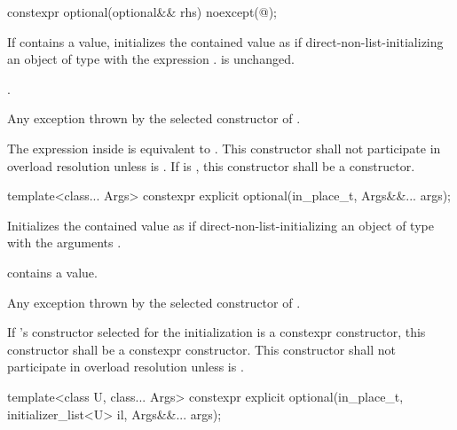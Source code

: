 %
\begin{itemdecl}
constexpr optional(optional&& rhs) noexcept(@\seebelow@);
\end{itemdecl}

\begin{itemdescr}
\pnum
\effects
If  contains a value, initializes the contained value as if
direct-non-list-initializing an object of type  with the expression .
 is unchanged.

\pnum
\postconditions
{}.

\pnum
\throws
Any exception thrown by the selected constructor of .

\pnum
\remarks
The expression inside  is equivalent to
.
This constructor shall not participate in overload resolution
unless  is .
If  is ,
this constructor shall be a  constructor.
\end{itemdescr}

%
\begin{itemdecl}
template<class... Args> constexpr explicit optional(in_place_t, Args&&... args);
\end{itemdecl}

\begin{itemdescr}
\pnum
\effects
Initializes the contained value as if direct-non-list-initializing an object of type  with the arguments .

\pnum
\postconditions
{} contains a value.

\pnum
\throws
Any exception thrown by the selected constructor of .

\pnum
\remarks
If 's constructor selected for the initialization is a constexpr constructor, this constructor shall be a constexpr constructor.
This constructor shall not participate in overload resolution
unless  is .
\end{itemdescr}

%
\begin{itemdecl}
template<class U, class... Args>
  constexpr explicit optional(in_place_t, initializer_list<U> il, Args&&... args);
\end{itemdecl}

